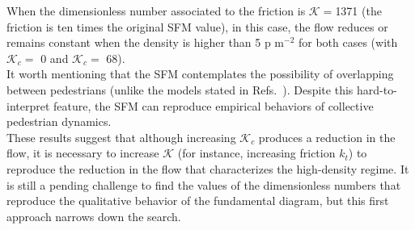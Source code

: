 \documentclass[preprint,12pt]{elsarticle}
\begin{document}
When the dimensionless number associated to the friction is $\mathcal{K}=$1371  (the friction is ten times the original SFM value), in this case, the flow reduces or remains constant when the density is higher than 5 p m$^{-2}$ for both cases (with $\mathcal{K}_c=$ 0 and $\mathcal{K}_c = $ 68).\\

It worth mentioning that the SFM contemplates the possibility of overlapping between pedestrians (unlike the models stated in Refs.~\cite{kabalan_2017,jebrane_2019}). Despite this hard-to-interpret feature, the SFM can reproduce empirical behaviors of collective pedestrian dynamics.\\

These results suggest that although increasing $\mathcal{K}_c$ produces a reduction in the flow, it is necessary to increase $\mathcal{K}$ (for instance, increasing friction $k_t$) to reproduce the reduction in the flow that characterizes the high-density regime. It is still a pending challenge to find the values of the dimensionless numbers that reproduce the qualitative behavior of the fundamental diagram, but this first approach narrows down the search.\\

\end{document}
